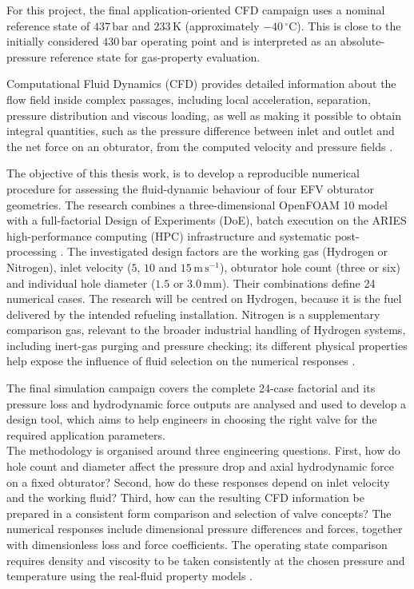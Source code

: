 For this project, the final application-oriented CFD campaign uses a nominal reference state of $437\,\mathrm{bar}$ and $233\,\mathrm{K}$ (approximately $-40\,^{\circ}\mathrm{C}$). This is close to the initially considered $430\,\mathrm{bar}$ operating point and is interpreted as an absolute-pressure reference state for gas-property evaluation. 

Computational Fluid Dynamics (CFD) provides detailed information about the flow field inside complex passages, including local acceleration, separation, pressure distribution and viscous loading, as well as making it possible to obtain integral quantities, such as the pressure difference between inlet and outlet and the net force on an obturator, from the computed velocity and pressure fields \cite{moukalled2016}.

The objective of this thesis work, is to develop a reproducible numerical procedure for assessing the fluid-dynamic behaviour of four EFV obturator geometries. The research combines a three-dimensional OpenFOAM 10 model with a full-factorial Design of Experiments (DoE), batch execution on the ARIES high-performance computing (HPC) infrastructure and systematic post-processing \cite{openfoam_user,hpc_aries}. The investigated design factors are the working gas (Hydrogen or Nitrogen), inlet velocity ($5$, $10$ and $15\,\mathrm{m\,s^{-1}}$), obturator hole count (three or six) and individual hole diameter ($1.5$ or $3.0\,\mathrm{mm}$). Their combinations define 24 numerical cases. The research will be centred on Hydrogen, because it is the fuel delivered by the intended refueling installation. Nitrogen is a supplementary comparison gas, relevant to the broader industrial handling of Hydrogen systems, including inert-gas purging and pressure checking; its different physical properties help expose the influence of fluid selection on the numerical responses \cite{h2tools_purging,doe_hydrogen_practices}.

The final simulation campaign covers the complete 24-case factorial and its pressure loss and hydrodynamic force outputs are analysed and used to develop a design tool, which aims to help engineers in choosing the right valve for the required application parameters.\\

The methodology is organised around three engineering questions. First, how do hole count and diameter affect the pressure drop and axial hydrodynamic force on a fixed obturator? Second, how do these responses depend on inlet velocity and the working fluid? Third, how can the resulting CFD information be prepared in a consistent form comparison and selection of valve concepts? The numerical responses include dimensional pressure differences and forces, together with dimensionless loss and force coefficients. The operating state comparison requires density and viscosity to be taken consistently at the chosen pressure and temperature using the real-fluid property models \cite{nist_refprop_online}.

